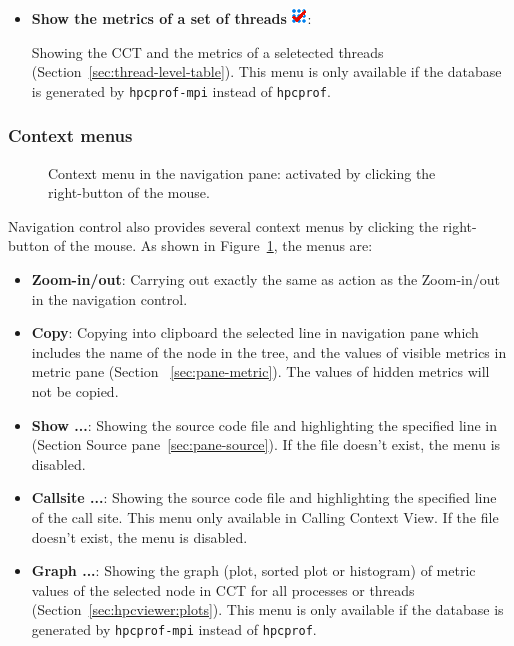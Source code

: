 \begin{itemize}
\item \textbf{Show the metrics of a set of threads} \includegraphics[scale=.8]{fig/hpcviewer-thread.png}:

Showing the CCT and the metrics of a seletected threads  (Section~\ref{sec:thread-level-table}). 
This menu is only available if the database is generated by \texttt{hpcprof-mpi} instead of \texttt{hpcprof}. 
 
\end{itemize}


\subsubsection{Context menus}
\begin{figure}
\caption{Context menu in the navigation pane: activated by clicking the right-button of the mouse.}
\label{fig:hpcviewer-menu-context}
\end{figure}
Navigation control also provides several context menus by clicking the right-button of the mouse. As shown in Figure~\ref{fig:hpcviewer-menu-context}, the menus are:
\begin{itemize}
 \item \textbf{Zoom-in/out}: Carrying out exactly the same as action as the Zoom-in/out in the navigation control.
 \item \textbf{Copy}: Copying into clipboard the selected line in navigation pane which includes the name of the node in the tree, and the values of visible metrics in metric pane (Section ~\ref{sec:pane-metric}). The values of hidden metrics will not be copied.
 \item \textbf{Show ...}: Showing the source code file and highlighting the specified line in (Section Source pane~\ref{sec:pane-source}). If the file doesn't exist, the menu is disabled.
 \item \textbf{Callsite ...}: Showing the source code file and highlighting the specified line of the call site. This menu only available in Calling Context View. If the file doesn't exist, the menu is disabled.
 \item \textbf{Graph ...}: Showing the graph (plot, sorted plot or histogram) of metric values of the selected node in CCT for all processes or threads (Section~\ref{sec:hpcviewer:plots}). This menu is only available if the database is generated by \texttt{hpcprof-mpi} instead of \texttt{hpcprof}. 
\end{itemize}


